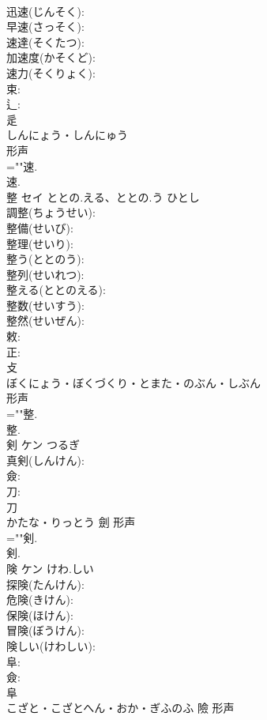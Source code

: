\documentclass[8pt]{extreport}
\begin{document}
\begin{CJK}{UTF8}{min}
\\	迅速(じんそく): 
\\	早速(さっそく): 
\\	速達(そくたつ): 
\\	加速度(かそくど): 
\\	速力(そくりょく): 
\\	束: 
\\	辶: 
\\	辵	
\\	しんにょう・しんにゅう	
\\	形声 
\\	=""速.
\\	速.
\\	整	セイ	ととの.える、ととの.う	ひとし	
\\	調整(ちょうせい): 
\\	整備(せいび): 
\\	整理(せいり): 
\\	整う(ととのう): 
\\	整列(せいれつ): 
\\	整える(ととのえる): 
\\	整数(せいすう): 
\\	整然(せいぜん): 
\\	敕: 
\\	正: 
\\	攴	
\\	ぼくにょう・ぼくづくり・とまた・のぶん・しぶん	
\\	形声 
\\	=""整.
\\	整.
\\	剣	ケン	つるぎ		
\\	真剣(しんけん): 
\\	僉: 
\\	刀: 
\\	刀	
\\	かたな・りっとう	劍	形声 
\\	=""剣.
\\	剣.
\\	険	ケン	けわ.しい		
\\	探険(たんけん): 
\\	危険(きけん): 
\\	保険(ほけん): 
\\	冒険(ぼうけん): 
\\	険しい(けわしい): 
\\	阜: 
\\	僉: 
\\	阜	
\\	こざと・こざとへん・おか・ぎふのふ	險	形声 

\end{CJK}
\end{document}
